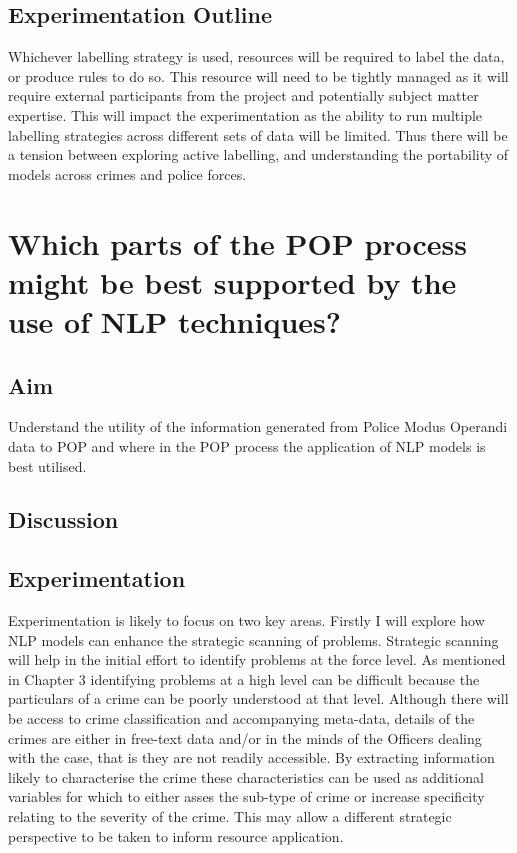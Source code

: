 \subsection{Experimentation Outline} Whichever labelling strategy is used, resources will be required to label the data, or produce rules to do so. This resource will need to be tightly managed as it will require external participants from the project and potentially subject matter expertise. This will impact the experimentation as the ability to run multiple labelling strategies across different sets of data will be limited. Thus there will be a tension between exploring active labelling, and understanding the portability of models across crimes and police forces. 


\section{Which parts of the POP process might be best supported by the use of NLP techniques?}


\subsection{Aim} Understand the utility of the information generated from Police Modus Operandi data to POP and where in the POP process the application of NLP models is best utilised.  


\subsection{Discussion} 

\subsection{Experimentation} Experimentation is likely to focus on two key areas. Firstly I will explore how NLP models can enhance the strategic scanning of problems.  Strategic scanning will help in the initial effort to identify problems at the force level. As mentioned in Chapter 3 identifying problems at a high level can be difficult because the particulars of a crime can be poorly understood at that level. Although there will be access to crime classification and accompanying meta-data, details of the crimes are either in free-text data and/or in the minds of the Officers dealing with the case, that is they are not readily accessible. By extracting information likely to characterise the crime these characteristics can be used as additional variables for which to either asses the sub-type of crime or increase specificity relating to the severity of the crime. This may allow a different strategic perspective to be taken to inform resource application. 

